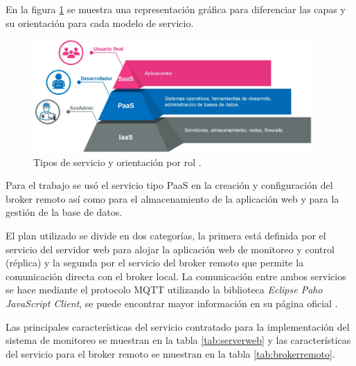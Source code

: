 En la figura \ref{fig:servicios} se muestra una representación gráfica para diferenciar las capas y su orientación para cada modelo de servicio.




\begin{figure}[htbp]
	\centering
	\includegraphics[width=0.95\textwidth]{./Figures/servicios.png}
	\caption{Tipos de servicio y orientación por rol \protect\footnotemark.}

	\label{fig:servicios}
\end{figure}

\vspace{2.5cm}


Para el trabajo se usó el servicio tipo PaaS en la creación y configuración del broker remoto así como para el almacenamiento de la aplicación web y para la gestión de la base de datos.


El plan utilizado se divide en dos categorías, la primera está definida por el servicio del servidor web para alojar la aplicación web de monitoreo y control (réplica) y la segunda por el servicio del broker remoto que permite la comunicación directa con el broker local. La comunicación entre ambos servicios se hace mediante el protocolo MQTT utilizando la biblioteca  \emph{Eclipse Paho JavaScript Client}, se puede encontrar mayor información en su página oficial \citep{WEBSITE:41}. 

Las principales características  del servicio contratado para la implementación del sistema de monitoreo se muestran en la tabla \ref{tab:serverweb} y las características del servicio para el broker remoto se muestran en la tabla  \ref{tab:brokerremoto}.


